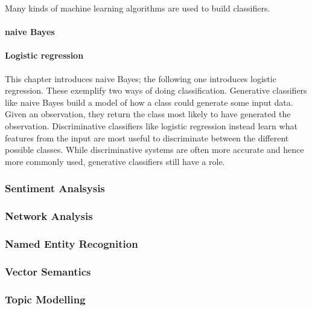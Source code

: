 \documentclass[]{book}
\let\oldparagraph\paragraph
\renewcommand{\paragraph}[1]{\oldparagraph{#1}\mbox{}}
\begin{document}
Many kinds of machine learning algorithms are used to build classifiers.

\paragraph{naive Bayes}\label{naive-bayes}

\paragraph{Logistic regression}\label{logistic-regression}

This chapter introduces naive Bayes; the following one introduces
logistic regression. These exemplify two ways of doing classification.
Generative classifiers like naive Bayes build a model of how a class
could generate some input data. Given an observation, they return the
class most likely to have generated the observation. Discriminative
classifiers like logistic regression instead learn what features from
the input are most useful to discriminate between the different possible
classes. While discriminative systems are often more accurate and hence
more commonly used, generative classifiers still have a role.

\subsubsection{Sentiment Analsysis}\label{sotatoolsmodelsentanal}

\subsubsection{Network Analysis}\label{sotatoolsmodelnetanal}

\subsubsection{Named Entity Recognition}\label{sotatoolsmodelner}

\subsubsection{Vector Semantics}\label{sotatoolsmodelvec}

\subsubsection{Topic Modelling}\label{sotatoolsmodeltopicmodel}
\end{document}
